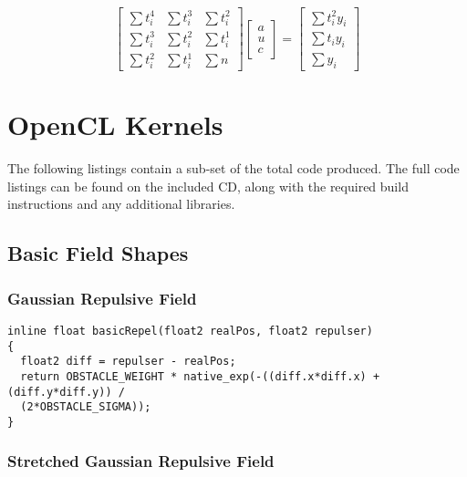 \begin{equation*}
  \left[
   \begin{matrix}
    \sum t_i^4 & \sum t_i^3 & \sum t_i^2 \\
    \sum t_i^3 & \sum t_i^2 & \sum t_i^1 \\
    \sum t_i^2 & \sum t_i^1 & \sum n
   \end{matrix}
  \right]
  \left[
   \begin{matrix}
    a \\
    u \\
    c
   \end{matrix}
  \right]
  =
  \left[
   \begin{matrix}
    \sum t_i^2 y_i \\
    \sum t_i y_i \\
    \sum y_i
   \end{matrix}
  \right]
\end{equation*}

\section{OpenCL Kernels\label{sub:OpenCL-Kernels}}

The following listings contain a sub-set of the total code produced. The full
code listings can be found on the included CD, along with the required build
instructions and any additional libraries.

\subsection{Basic Field Shapes}


\subsubsection{Gaussian Repulsive Field\label{app:gaussianRepulsive}}

\begin{lstlisting}
inline float basicRepel(float2 realPos, float2 repulser)
{
  float2 diff = repulser - realPos;
  return OBSTACLE_WEIGHT * native_exp(-((diff.x*diff.x) + (diff.y*diff.y)) /
  (2*OBSTACLE_SIGMA)); 
}
\end{lstlisting}

\subsubsection{Stretched Gaussian Repulsive
Field\label{app:stretchedGaussianRepulsive}}

